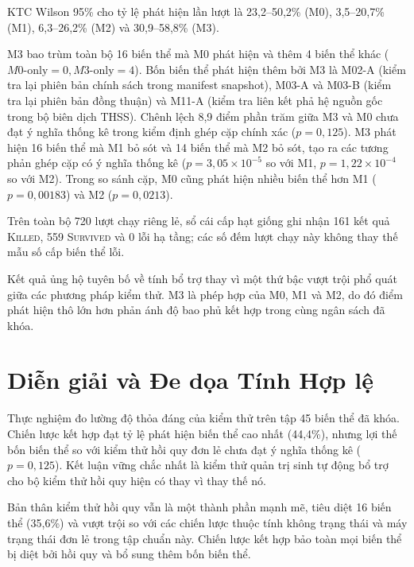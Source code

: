 \documentclass[11pt]{article}
\begin{document}
KTC Wilson 95\% cho tỷ lệ phát hiện lần lượt là 23,2--50,2\% (M0), 3,5--20,7\% (M1), 6,3--26,2\% (M2) và 30,9--58,8\% (M3).

M3 bao trùm toàn bộ 16 biến thể mà M0 phát hiện và thêm 4 biến thể khác ($M0\text{-only} = 0, M3\text{-only} = 4$). Bốn biến thể phát hiện thêm bởi M3 là M02-A (kiểm tra lại phiên bản chính sách trong manifest snapshot), M03-A và M03-B (kiểm tra lại phiên bản đồng thuận) và M11-A (kiểm tra liên kết phả hệ nguồn gốc trong bộ biên dịch THSS). Chênh lệch 8,9 điểm phần trăm giữa M3 và M0 chưa đạt ý nghĩa thống kê trong kiểm định ghép cặp chính xác ($p=0{,}125$). M3 phát hiện 16 biến thể mà M1 bỏ sót và 14 biến thể mà M2 bỏ sót, tạo ra các tương phản ghép cặp có ý nghĩa thống kê ($p = 3{,}05\times10^{-5}$ so với M1, $p = 1{,}22\times10^{-4}$ so với M2). Trong so sánh cặp, M0 cũng phát hiện nhiều biến thể hơn M1 ($p=0{,}00183$) và M2 ($p=0{,}0213$).

Trên toàn bộ 720 lượt chạy riêng lẻ, sổ cái cấp hạt giống ghi nhận 161 kết quả \textsc{Killed}, 559 \textsc{Survived} và 0 lỗi hạ tầng; các số đếm lượt chạy này không thay thế mẫu số cấp biến thể lỗi.

Kết quả ủng hộ tuyên bố về tính bổ trợ thay vì một thứ bậc vượt trội phổ quát giữa các phương pháp kiểm thử. M3 là phép hợp của M0, M1 và M2, do đó điểm phát hiện thô lớn hơn phản ánh độ bao phủ kết hợp trong cùng ngân sách đã khóa.

\section{Diễn giải và Đe dọa Tính Hợp lệ}
Thực nghiệm đo lường độ thỏa đáng của kiểm thử trên tập 45 biến thể đã khóa. Chiến lược kết hợp đạt tỷ lệ phát hiện biến thể cao nhất (44,4\%), nhưng lợi thế bốn biến thể so với kiểm thử hồi quy đơn lẻ chưa đạt ý nghĩa thống kê ($p = 0{,}125$). Kết luận vững chắc nhất là kiểm thử quản trị sinh tự động bổ trợ cho bộ kiểm thử hồi quy hiện có thay vì thay thế nó.

Bản thân kiểm thử hồi quy vẫn là một thành phần mạnh mẽ, tiêu diệt 16 biến thể (35,6\%) và vượt trội so với các chiến lược thuộc tính không trạng thái và máy trạng thái đơn lẻ trong tập chuẩn này. Chiến lược kết hợp bảo toàn mọi biến thể bị diệt bởi hồi quy và bổ sung thêm bốn biến thể.
\end{document}
